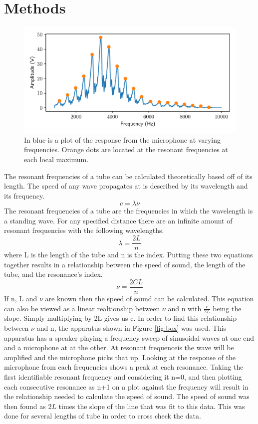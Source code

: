 \documentclass[a4paper, 12pt, twocolumn]{article}
\begin{document}
\section{Methods}
\begin{figure}[h]
	\centering
	\includegraphics[scale=0.75]{../peaks.pdf}
	\caption{In blue is a plot of the response from the microphone at varying frequencies. Orange dots are located at the resonant frequencies at each local maximum. }
	\label{fig:spectra}
\end{figure}
The resonant frequencies of a tube can be calculated theoretically based off of its length. The speed of any wave propagates at is described by its wavelength and its frequency.
\begin{equation}
c=\lambda\nu
\end{equation}
The resonant frequencies of a tube are the frequencies in which the wavelength is a standing wave. For any specified distance there are an infinite amount of resonant frequencies with the following wavelengths.
\begin{equation}
\lambda=\frac{2L}{n}
\end{equation}
where L is the length of the tube and n is the index. Putting these two equations together results in a relationship between the speed of sound, the length of the tube, and the resonance's index. 
\begin{equation}
\nu=\frac{2CL}{n}
\end{equation}
If n, L and $\nu$ are known then the speed of sound can be calculated. This equation can also be viewed as a linear realtionship between $\nu$ and n with $\frac{c}{2L}$  being the slope. Simply multiplying by 2L gives us c. 
In order to find this relationship between $\nu$ and n, the apparatus shown in Figure \ref{fig:box} was used. This apparatus has a speaker playing a frequency sweep of sinusoidal waves at one end and a microphone at at the other. At resonant frequenceis the wave will be amplified and the microphone picks that up. Looking at the response of the microphone from each frequencies shows a peak at each resonance. Taking the first identifiable resonant frequency and considering it n=0, and then plotting each consecutive resonance as n+1 on a plot against the frequency will result in the relationship needed to calculate the speed of sound. The speed of sound was then found as $2L$ times the slope of the line that was fit to this data. This was done for several lengths of tube in order to cross check the data. 
\end{document}
